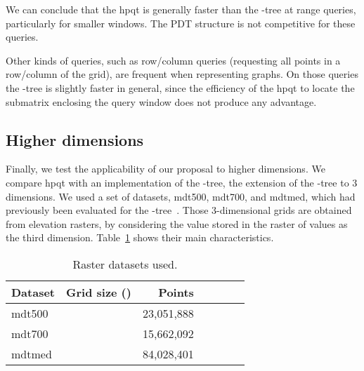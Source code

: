\documentclass{elsarticle}
\newcommand{\kt}{-tree\xspace}
\newcommand{\ktree}{\kt}
\newcommand{\koct}{-tree\xspace}
\newcommand{\mdta}{\textsf{mdt500}\xspace}
\newcommand{\mdtb}{\textsf{mdt700}\xspace}
\newcommand{\mdtc}{\textsf{mdtmed}\xspace}
\newcommand{\hpqt}{\textsf{hpqt}\xspace}
\newcommand{\pdt}{PDT\xspace}
\newcommand{\no}[1]{}
\begin{document}
We can conclude that the \hpqt is generally faster than the \kt at range queries, particularly for smaller windows. The \pdt structure is not competitive for these queries.



\no{
\begin{figure}[t!]
 \centering
     \texttt{[image: figures/rows/rows-dblp]}
    \texttt{[image: figures/rows/rows-indochina]}
    \texttt{[image: figures/rows/rows-enwiki]}
    \texttt{[image: figures/rows/rows-uk]}
    \texttt{[image: figures/rows/rows-geo-sparse]}
    \texttt{[image: figures/rows/rows-rdf-sparse]}
    \texttt{[image: figures/rows/rows-geo-med]}
    \texttt{[image: figures/rows/rows-rdf-med]}
    \texttt{[image: figures/rows/rows-geo-dense]}
    \texttt{[image: figures/rows/rows-rdf-dense]}
  \caption{Query times for row queries.}
  \label{fig:rows}
\end{figure}
}

Other kinds of queries, such as row/column queries (requesting all points in a row/column of the grid), are frequent when representing graphs. On those queries the \ktree is slightly faster in general, since the efficiency of the \hpqt to locate the submatrix enclosing the query window does not produce any advantage. 


\subsection{Higher dimensions}

Finally, we test the applicability of our proposal to higher dimensions. We compare \hpqt with an implementation of the \koct, the extension of the \kt to 3 dimensions. We used a set of datasets, \mdta, \mdtb, and \mdtc, which had previously been evaluated for the \koct~\cite{BCBNP20}. Those 3-dimensional grids are obtained from elevation rasters, by considering the value stored in the raster of values as the third dimension. Table~\ref{tab:spaceraster} shows their main characteristics. 

\begin{table}[t]
\centering
\begin{tabular}{ l | r r r | r r r}
Dataset & Grid size () & Points \\
\hline
\mdta   &    &  23,051,888  \\
\mdtb   &    &  15,662,092 \\
\mdtc   &    &  84,028,401  \\
\hline
\end{tabular}
\caption{Raster datasets used.}
\label{tab:spaceraster}
\end{table}
\end{document}
